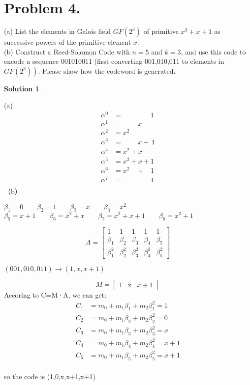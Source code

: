 \documentclass[UTF8,oneside]{article}
\newtheorem*{Solution}{Solution}
\begin{document}
\section*{Problem 4.}
(a) List the elements in Galois field $G F\left(2^{3}\right)$ of primitive $x^{3}+x+1$ as successive powers of the primitive element $x$.\\
(b) Construct a Reed-Solomon Code with $n=5$ and $k=3$, and use this code to encode a sequence 001010011 (first converting 001,010,011 to elements in $\left.G F\left(2^{3}\right)\right)$. Please show how the codeword is generated.
\begin{Solution}
\end{Solution}
(a)
\begin{align*}
\alpha^0&=\quad\quad\quad\quad1\\
\alpha^1&=\quad\quad\, x\\
\alpha^2&=x^2\\
\alpha^3&=\quad\quad \,x +\, 1\\
\alpha^4&=x^2+x\\
\alpha^5&=x^2+x+1\\
\alpha^6&=x^2\quad+\;\;\;1\\
\alpha^7&=\quad\quad\quad\quad1\\

\end{align*}
（b）
\begin{center}
$\beta_1=0\qquad \beta_2=1\qquad\beta_3=x\qquad\beta_4=x^2$\\
$\beta_5=x+1\qquad \beta_6=x^2+x\qquad\beta_7=x^2+x+1\qquad\beta_8=x^2+1$\\
\end{center}
$$A=\left[\begin{array}{ccccc}1 & 1 & 1 & 1 & 1 \\ \beta_{1} & \beta_{2} & \beta_{3} & \beta_{4} & \beta_{5} \\ \beta_{1}^{2} & \beta_{2}^{2} & \beta_{3}^{2} & \beta_{4}^{2} & \beta_{5}^{2}\end{array}\right]$$
\begin{center}
$(001,010,011)\rightarrow(1,x,x+1)$
\end{center}
$$M=\left[\begin{array}{lll}1 & \mathrm{x} & x+1\end{array}\right]$$
Accoring to C=M·A,  we can get:
\begin{align*}
C_1&=m_0+m_1\beta_1+m_2\beta_1^2=1\\
C_2&=m_0+m_1\beta_2+m_2\beta_2^2=0\\
C_3&=m_0+m_1\beta_3+m_2\beta_3^2=x\\
C_4&=m_0+m_1\beta_4+m_2\beta_4^2=x+1\\
C_5&=m_0+m_1\beta_5+m_2\beta_5^2=x+1\\
\end{align*}
\begin{center}
so the code is (1,0,x,x+1,x+1)
\end{center}
\end{document}
